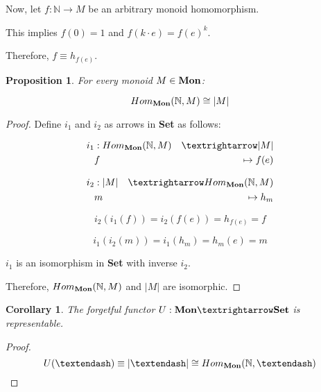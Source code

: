 \documentclass[notitlepage,a4paper]{article}
\newtheorem{proposition}{Proposition}
\newtheorem{corollary}{Corollary}
\begin{document}
\begin{enumerate}
    Now, let $f : \mathbb{N} → M$ be an arbitrary monoid homomorphism.

    This implies $f(0) = 1$ and $f(k·e) = f(e)^k$.

    Therefore, $f \equiv h_{f(e)}$.

    \begin{proposition}
      For every monoid $M \in \text{\bf Mon}$:

      $$Hom_{\text{\bf Mon}}(\mathbb{N}, M) \cong \vert M \vert$$
    \end{proposition}

    \begin{proof}

      Define $i_1$ and $i_2$ as arrows in {\bf Set} as follows:
      
      \begin{eqnarray*}
        i_1  & :   Hom_{\text{\bf Mon}}(\mathbb{N}, M) &→        \vert M \vert \\      
             & f                              &\mapsto   f(e)          \\
      \end{eqnarray*}

      \begin{eqnarray*}
        i_2 & : \vert M \vert & →      Hom_{\text{\bf Mon}}(\mathbb{N}, M) \\
            &        m        & \mapsto  h_m                          \\
      \end{eqnarray*}

      $$i_2(i_1(f)) = i_2(f(e)) = h_{f(e)} = f$$ 

      $$i_1(i_2(m)) = i_1(h_m) = h_m(e) = m$$

      $i_1$ is an isomorphism in {\bf Set} with inverse $i_2$.

      Therefore, $Hom_{\text{\bf Mon}}(\mathbb{N}, M)$ and $\vert M \vert$ are
      isomorphic.
      
    \end{proof}

    \begin{corollary}
      The forgetful functor $U : \text{\bf Mon} → \text{\bf Set}$
      is representable.

    \end{corollary}
    \begin{proof}
      
      $$U(–) \equiv \vert – \vert \cong Hom_{\text{\bf Mon}}(\mathbb{N}, –)$$
    \end{proof}


\end{enumerate}
\end{document}
